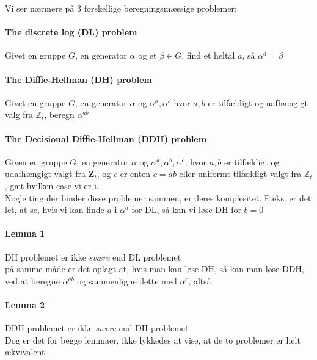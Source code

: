 \documentclass[paper=a4, fontsize=11pt]{scrartcl} %
\numberwithin{equation}{section} %
\numberwithin{figure}{section} %
\numberwithin{table}{section} %
\begin{document}
	Vi ser nærmere på 3 forskellige beregningsmæssige problemer:
	
	\paragraph{\textbf{The discrete log (DL) problem}} Givet en gruppe $G$, en generator $\alpha$ og et $\beta\in G$, find et heltal $a$, så $\alpha^a=\beta$
	
	\paragraph{\textbf{The Diffie-Hellman (DH) problem}} Givet en gruppe $G$, en generator $\alpha$ og $\alpha^a,\alpha^b$ hvor $a,b$ er tilfældigt og uafhængigt valg fra $\mathbb{Z}_t$, beregn $\alpha^{ab}$
	
	\paragraph{\textbf{The Decisional Diffie-Hellman (DDH) problem}} Given en gruppe $G$, en generator $\alpha$ og $\alpha^a, \alpha^b,\alpha^c$, hvor $a,b$ er tilfældigt og udafhængigt valgt fra $\mathbf{Z}_t$, og $c$ er enten $c=ab$ eller uniformt tilfældigt valgt fra $\mathbb{Z}_t$, gæt hvilken case vi er i. \\
	
	Nogle ting der binder disse problemer sammen, er deres komplesitet. F.eks. er det let, at se, hvis vi kan finde $a$ i $\alpha^a$ for DL, så kan vi løse DH for $b=0$
	
	\paragraph{\textbf{Lemma 1}} DH problemet er ikke \textit{svære} end DL problemet \\
	
	på samme måde er det oplagt at, hvis man kan løse DH, så kan man løse DDH, ved at beregne $\alpha^{ab}$ og sammenligne dette med $\alpha^c$, altså
	
	\paragraph{\textbf{Lemma 2}} DDH problemet er ikke \textit{svære} end DH problemet \\
	
	Dog er det for begge lemmaer, ikke lykkedes at vise, at de to problemer er helt ækvivalent. \\
	
\end{document}
